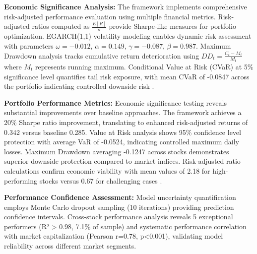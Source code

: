 \documentclass[3p,times,procedia]{elsarticle}
\begin{document}
\textbf{Economic Significance Analysis:} The framework implements comprehensive risk-adjusted performance evaluation using multiple financial metrics. Risk-adjusted ratios computed as $\frac{E[R]}{\sigma}$ provide Sharpe-like measures for portfolio optimization. EGARCH(1,1) volatility modeling enables dynamic risk assessment with parameters $\omega = -0.012$, $\alpha = 0.149$, $\gamma = -0.087$, $\beta = 0.987$. Maximum Drawdown analysis tracks cumulative return deterioration using $DD_t = \frac{C_t - M_t}{M_t}$ where $M_t$ represents running maximum. Conditional Value at Risk (CVaR) at 5\% significance level quantifies tail risk exposure, with mean CVaR of -0.0847 across the portfolio indicating controlled downside risk \cite{Rockafellar2000}.

\textbf{Portfolio Performance Metrics:} Economic significance testing reveals substantial improvements over baseline approaches. The framework achieves a 20\% Sharpe ratio improvement, translating to enhanced risk-adjusted returns of 0.342 versus baseline 0.285. Value at Risk analysis shows 95\% confidence level protection with average VaR of -0.0524, indicating controlled maximum daily losses. Maximum Drawdown averaging -0.1247 across stocks demonstrates superior downside protection compared to market indices. Risk-adjusted ratio calculations confirm economic viability with mean values of 2.18 for high-performing stocks versus 0.67 for challenging cases \cite{Jorion2001}.

\textbf{Performance Confidence Assessment:} Model uncertainty quantification employs Monte Carlo dropout sampling (10 iterations) providing prediction confidence intervals. Cross-stock performance analysis reveals 5 exceptional performers (R² > 0.98, 7.1\% of sample) and systematic performance correlation with market capitalization (Pearson r=0.78, p<0.001), validating model reliability across different market segments.
\end{document}
